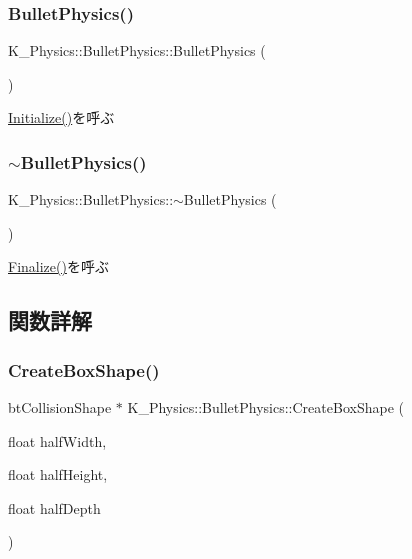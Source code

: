 \subsubsection{\texorpdfstring{Bullet\+Physics()}{BulletPhysics()}}
{\footnotesize\ttfamily K\+\_\+\+Physics\+::\+Bullet\+Physics\+::\+Bullet\+Physics (\begin{DoxyParamCaption}{ }\end{DoxyParamCaption})}



\mbox{\hyperlink{class_k___physics_1_1_bullet_physics_ad280b1eeb62f13463d47be6182d5b978}{Initialize()}}を呼ぶ 

\mbox{\label{class_k___physics_1_1_bullet_physics_a0fca03e6a99d9cc53cc86f54629f23a7}} 
\subsubsection{\texorpdfstring{$\sim$\+Bullet\+Physics()}{~BulletPhysics()}}
{\footnotesize\ttfamily K\+\_\+\+Physics\+::\+Bullet\+Physics\+::$\sim$\+Bullet\+Physics (\begin{DoxyParamCaption}{ }\end{DoxyParamCaption})}



\mbox{\hyperlink{class_k___physics_1_1_bullet_physics_ae7d67b163870213501e3bba697981b35}{Finalize()}}を呼ぶ 



\subsection{関数詳解}
\mbox{\label{class_k___physics_1_1_bullet_physics_a12af3e18b74c5dd8bf6a866f6eb1df03}} 
\subsubsection{\texorpdfstring{Create\+Box\+Shape()}{CreateBoxShape()}}
{\footnotesize\ttfamily bt\+Collision\+Shape $\ast$ K\+\_\+\+Physics\+::\+Bullet\+Physics\+::\+Create\+Box\+Shape (\begin{DoxyParamCaption}\item[{float}]{half\+Width,  }\item[{float}]{half\+Height,  }\item[{float}]{half\+Depth }\end{DoxyParamCaption})}



